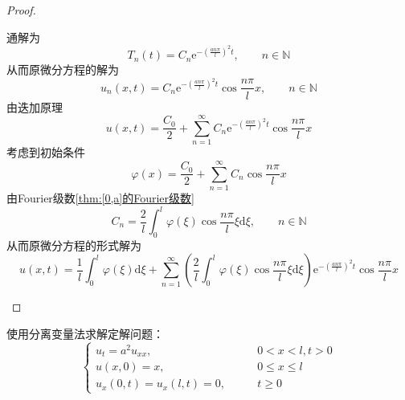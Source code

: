 \documentclass[lang = cn, scheme = chinese, thmcnt = section]{elegantbook}
\newcommand{\N}{\mathbb{N}}            %
\newcommand{\dd}{\mathrm{d}}           %
\newcommand{\ee}[1]{\mathrm{e}^{#1}}   %
\begin{document}
\begin{proof}
\begin{enumerate}
$$		$$
		通解为
		$$
		T_n(t)=C_n\ee{-\left(\frac{an\pi}{l}\right)^2t},\qquad n\in\N
		$$
		从而原微分方程的解为
		$$
		u_n(x,t)
		=C_n\ee{-\left(\frac{an\pi}{l}\right)^2t}\cos\frac{n\pi}{l}x,\qquad 
		n\in\N
		$$
		由迭加原理
		$$
		u(x,t)=\frac{C_0}{2}+\sum_{n=1}^{\infty}C_n\ee{-\left(\frac{an\pi}{l}\right)^2t}\cos\frac{n\pi}{l}x
		$$
		考虑到初始条件
		$$
		\varphi(x)=\frac{C_0}{2}+\sum_{n=1}^{\infty}C_n\cos\frac{n\pi}{l}x
		$$
		由Fourier级数\ref{thm:[0,a]的Fourier级数}
		$$
		C_n=\frac{2}{l}\int_0^l\varphi(\xi)\cos\frac{n\pi }{l}\xi\dd \xi,\qquad n\in\N
		$$
		从而原微分方程的形式解为
		$$
		u(x,t)=\frac{1}{l}\int_0^l\varphi(\xi)\dd \xi+\sum_{n=1}^{\infty}\left(\frac{2}{l}\int_0^l\varphi(\xi)\cos\frac{n\pi }{l}\xi\dd \xi\right)\ee{-\left(\frac{an\pi}{l}\right)^2t}\cos\frac{n\pi}{l}x
		$$
	\end{enumerate}
\end{proof}

\begin{example}
	使用分离变量法求解定解问题：%
	$$
	\begin{cases}
		u_t=a^2u_{xx},\qquad & 0<x<l,t>0\\
		u(x,0)=x,\qquad & 0\le x\le l\\
		u_x(0,t)=u_x(l,t)=0,\qquad & t\ge 0
	\end{cases}
	$$
\end{example}
\end{document}
